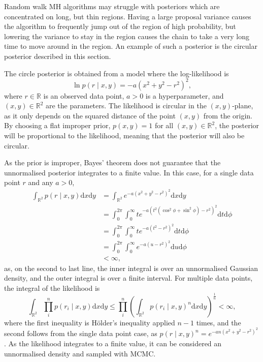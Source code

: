 \documentclass[english,twoside,openright]{HYgraduMLDS}
\newcommand{\R}{\mathbb{R}}
\newcommand{\dx}{\mathrm{d}}
\begin{document}
Random walk MH algorithms may struggle with posteriors which are concentrated
on long, but thin regions. Having a large proposal variance causes the algorithm
to frequently jump out of the region of high probability, but lowering the
variance to stay in the region causes the chain to take a very long time to move
around in the region. An example of such a posterior is the circular posterior
described in this section.

The circle posterior is obtained from a model where the log-likelihood is
\[
    \ln p(r\mid x, y) = -a(x^2 + y^2 - r^2)^2,
\]
where \(r\in \R\) is an observed data point, \(a > 0\) is a hyperparameter,
and \((x, y)\in \R^{2}\) are the parameters.
The likelihood is circular in the \((x, y)\)-plane, as it only depends on the
squared distance of the point \((x, y)\) from the origin. By choosing a flat
improper prior, \(p(x, y) = 1\) for all \((x, y)\in \R^{2}\), the posterior will be
proportional to the likelihood, meaning that the posterior will also be circular.

As the prior is improper, Bayes' theorem does not guarantee that the
unnormalised posterior integrates to a finite
value. In this case, for a single data point \(r\) and any \(a > 0\),
\begin{align*}
  \int_{\R^{2}}p(r\mid x, y)\dx x\dx y
  &= \int_{\R^{2}}e^{-a(x^{2} + y^{2} - r^{2})^{2}}\dx x\dx y
  \\&= \int_{0}^{2\pi}\int_{0}^{\infty}
  te^{-a(t^{2}(\cos^{2} \phi + \sin^{2} \phi) - r^{2})^{2}} \dx t\dx \phi
  \\&= \int_{0}^{2\pi} \int_{0}^{\infty} te^{-a(t^{2} - r^{2})^{2}}\dx t\dx \phi
  \\&= \int_{0}^{2\pi} \int_{0}^{\infty} e^{-a(u - r^{2})^{2}}\dx u\dx \phi
  \\&< \infty,
\end{align*}
as, on the second to last line, the inner integral is over an unnormalised
Gaussian density, and
the outer integral is over a finite interval. For multiple data points, the
integral of the likelihood is
\[
  \int_{\R^{2}}\prod_{i}^{n}p(r_{i}\mid x,y)\dx x\dx y
  \leq \prod_{i}^{n}\left(\int_{\R^{2}}p(r_{i}\mid x,y)^{n}\dx x\dx y\right)^{\frac{1}{n}}
  < \infty,
\]
where the first inequality is Hölder's inequality applied \(n - 1\) times,
and the second follows from the single data point case, as
\(p(r\mid x,y)^{n} = e^{-an(x^{2} + y^{2} - r^{2})^{2}}\).
As the likelihood integrates to a
finite value, it can be considered an unnormalised density and sampled with MCMC.
\end{document}

